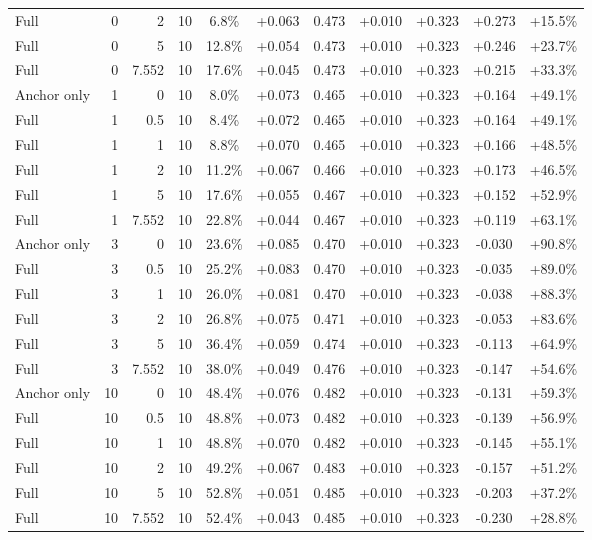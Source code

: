 \begin{table}[htbp]
\begin{tabular}{lrrrccccccc}
Full & 0 & 2 & 10 & 6.8\% & +0.063 & 0.473 & +0.010 & +0.323 & +0.273 & +15.5\% \\
Full & 0 & 5 & 10 & 12.8\% & +0.054 & 0.473 & +0.010 & +0.323 & +0.246 & +23.7\% \\
Full & 0 & 7.552 & 10 & 17.6\% & +0.045 & 0.473 & +0.010 & +0.323 & +0.215 & +33.3\% \\
Anchor only & 1 & 0 & 10 & 8.0\% & +0.073 & 0.465 & +0.010 & +0.323 & +0.164 & +49.1\% \\
Full & 1 & 0.5 & 10 & 8.4\% & +0.072 & 0.465 & +0.010 & +0.323 & +0.164 & +49.1\% \\
Full & 1 & 1 & 10 & 8.8\% & +0.070 & 0.465 & +0.010 & +0.323 & +0.166 & +48.5\% \\
Full & 1 & 2 & 10 & 11.2\% & +0.067 & 0.466 & +0.010 & +0.323 & +0.173 & +46.5\% \\
Full & 1 & 5 & 10 & 17.6\% & +0.055 & 0.467 & +0.010 & +0.323 & +0.152 & +52.9\% \\
Full & 1 & 7.552 & 10 & 22.8\% & +0.044 & 0.467 & +0.010 & +0.323 & +0.119 & +63.1\% \\
Anchor only & 3 & 0 & 10 & 23.6\% & +0.085 & 0.470 & +0.010 & +0.323 & -0.030 & +90.8\% \\
Full & 3 & 0.5 & 10 & 25.2\% & +0.083 & 0.470 & +0.010 & +0.323 & -0.035 & +89.0\% \\
Full & 3 & 1 & 10 & 26.0\% & +0.081 & 0.470 & +0.010 & +0.323 & -0.038 & +88.3\% \\
Full & 3 & 2 & 10 & 26.8\% & +0.075 & 0.471 & +0.010 & +0.323 & -0.053 & +83.6\% \\
Full & 3 & 5 & 10 & 36.4\% & +0.059 & 0.474 & +0.010 & +0.323 & -0.113 & +64.9\% \\
Full & 3 & 7.552 & 10 & 38.0\% & +0.049 & 0.476 & +0.010 & +0.323 & -0.147 & +54.6\% \\
Anchor only & 10 & 0 & 10 & 48.4\% & +0.076 & 0.482 & +0.010 & +0.323 & -0.131 & +59.3\% \\
Full & 10 & 0.5 & 10 & 48.8\% & +0.073 & 0.482 & +0.010 & +0.323 & -0.139 & +56.9\% \\
Full & 10 & 1 & 10 & 48.8\% & +0.070 & 0.482 & +0.010 & +0.323 & -0.145 & +55.1\% \\
Full & 10 & 2 & 10 & 49.2\% & +0.067 & 0.483 & +0.010 & +0.323 & -0.157 & +51.2\% \\
Full & 10 & 5 & 10 & 52.8\% & +0.051 & 0.485 & +0.010 & +0.323 & -0.203 & +37.2\% \\
Full & 10 & 7.552 & 10 & 52.4\% & +0.043 & 0.485 & +0.010 & +0.323 & -0.230 & +28.8\% \\

\end{tabular}
\end{table}
